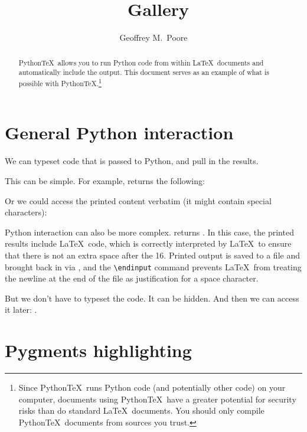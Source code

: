 \documentclass[11pt]{article}
\title{\pytex\ Gallery}
\author{Geoffrey M.\ Poore}
\newcommand{\pytex}{Python\TeX}
\begin{document}
\maketitle


\begin{abstract}
\pytex\ allows you to run Python code from within \LaTeX\ documents and automatically include the output.  This document serves as an example of what is possible with \pytex.\footnote{Since \pytex\ runs Python code (and potentially other code) on your computer, documents using \pytex\ have a greater potential for security risks than do standard \LaTeX\ documents.  You should only compile \pytex\ documents from sources you trust.}
\end{abstract}



\section{General Python interaction}

We can typeset code that is passed to Python, and pull in the results.

This can be simple.  For example,  returns the following:
\begin{quote}
\printpythontex
\end{quote}

Or we could access the printed content verbatim (it might contain special characters):
\begin{quote}
\printpythontex[verb]
\end{quote}

Python interaction can also be more complex.   returns \printpythontex.  In this case, the printed results include \LaTeX\ code, which is correctly interpreted by \LaTeX\ to ensure that there is not an extra space after the 16.  Printed output is saved to a file and brought back in via \verb||, and the \verb|\endinput| command prevents \LaTeX\ from treating the newline at the end of the file as justification for a space character.

But we don't have to typeset the code.  It can be hidden.  And then we can access it later:  .


\section{Pygments highlighting}
\end{document}
